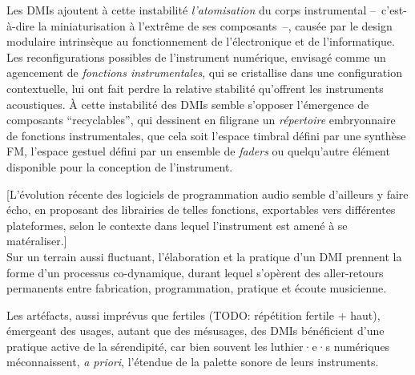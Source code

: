 Les \glspl{DMI} ajoutent à cette instabilité \textit{l'atomisation} du corps instrumental --~c'est-à-dire la miniaturisation à l'extrême de ses composants~--, causée par le design modulaire intrinsèque au fonctionnement de l'électronique et de l'informatique. Les reconfigurations possibles de l'instrument numérique, envisagé comme un agencement de \textit{fonctions instrumentales}, qui se cristallise dans une configuration contextuelle, lui ont fait perdre la relative stabilité qu'offrent les instruments acoustiques. À cette instabilité des \glspl{DMI} semble s'opposer l'émergence de composants ``recyclables'', qui dessinent en filigrane un \textit{répertoire} embryonnaire de fonctions instrumentales, que cela soit l'espace timbral défini par une synthèse FM, l'espace gestuel défini par un ensemble de \textit{faders} ou quelqu'autre élément disponible pour la conception de l'instrument.

[L'évolution récente des logiciels de programmation audio semble d'ailleurs y faire écho, en proposant des librairies de telles fonctions, exportables vers différentes plateformes, selon le contexte dans lequel l'instrument est amené à se matéraliser.]\\
\indent Sur un terrain aussi fluctuant, l'élaboration et la pratique d'un \gls{DMI} prennent la forme d'un processus co-dynamique, durant lequel s'opèrent des aller-retours permanents entre fabrication, programmation, pratique et écoute musicienne.

Les artéfacts, aussi imprévus que fertiles (TODO: répétition fertile + haut), émergeant des usages, autant que des mésusages, des \glspl{DMI} bénéficient d'une pratique active de la sérendipité, car bien souvent les luthier·e·s numériques méconnaissent, \textit{a priori}, l'étendue de la palette sonore de leurs instruments.

